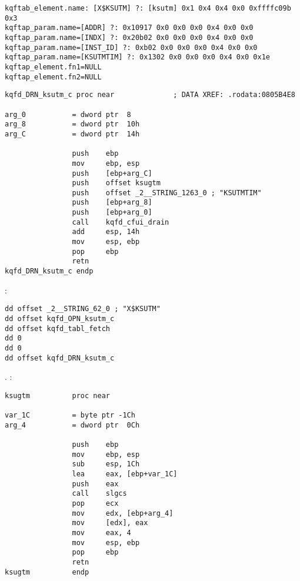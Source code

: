 \begin{lstlisting}[caption=\RU{Результат работы}\EN{Result of} \OracleTablesName]
kqftab_element.name: [X$KSUTM] ?: [ksutm] 0x1 0x4 0x4 0x0 0xffffc09b 0x3
kqftap_param.name=[ADDR] ?: 0x10917 0x0 0x0 0x0 0x4 0x0 0x0
kqftap_param.name=[INDX] ?: 0x20b02 0x0 0x0 0x0 0x4 0x0 0x0
kqftap_param.name=[INST_ID] ?: 0xb02 0x0 0x0 0x0 0x4 0x0 0x0
kqftap_param.name=[KSUTMTIM] ?: 0x1302 0x0 0x0 0x0 0x4 0x0 0x1e
kqftap_element.fn1=NULL
kqftap_element.fn2=NULL
\end{lstlisting}


\begin{lstlisting}
kqfd_DRN_ksutm_c proc near              ; DATA XREF: .rodata:0805B4E8

arg_0           = dword ptr  8
arg_8           = dword ptr  10h
arg_C           = dword ptr  14h

                push    ebp
                mov     ebp, esp
                push    [ebp+arg_C]
                push    offset ksugtm
                push    offset _2__STRING_1263_0 ; "KSUTMTIM"
                push    [ebp+arg_8]
                push    [ebp+arg_0]
                call    kqfd_cfui_drain
                add     esp, 14h
                mov     esp, ebp
                pop     ebp
                retn
kqfd_DRN_ksutm_c endp
\end{lstlisting}

   
 :

\begin{lstlisting}
dd offset _2__STRING_62_0 ; "X$KSUTM"
dd offset kqfd_OPN_ksutm_c
dd offset kqfd_tabl_fetch
dd 0
dd 0
dd offset kqfd_DRN_ksutm_c
\end{lstlisting}

.
:

\begin{lstlisting}[caption=ksu.o]
ksugtm          proc near

var_1C          = byte ptr -1Ch
arg_4           = dword ptr  0Ch

                push    ebp
                mov     ebp, esp
                sub     esp, 1Ch
                lea     eax, [ebp+var_1C]
                push    eax
                call    slgcs
                pop     ecx
                mov     edx, [ebp+arg_4]
                mov     [edx], eax
                mov     eax, 4
                mov     esp, ebp
                pop     ebp
                retn
ksugtm          endp
\end{lstlisting}

